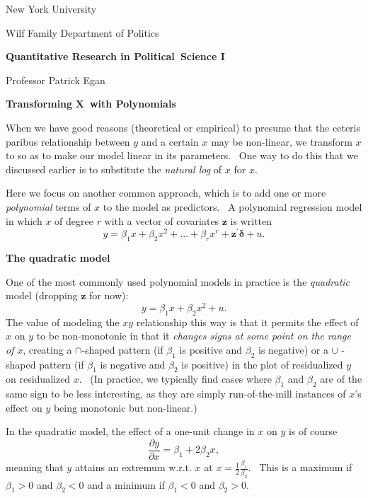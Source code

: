 \documentclass[11pt]{article}
\begin{document}
New York University

Wilf Family Department of Politics

\begin{center}
{\large \textbf{Quantitative Research in Political\ Science I}}

Professor Patrick Egan

\bigskip

\textbf{Transforming }$\mathbf{X}$\textbf{\ with Polynomials}\bigskip 
\end{center}

When we have good reasons (theoretical or empirical) to presume that the
ceteris paribus relationship between $y$ and a certain $x$ may be
non-linear, we transform $x$ to so as to make our model linear in its
parameters. \ One way to do this that we discussed earlier is to substitute
the \textit{natural log }of $x$ for $x$. \ 

Here we focus on another common approach, which is to add one or more 
\textit{polynomial }terms of $x$ to the model as predictors. \ A polynomial
regression model in which $x$ of degree $r$ with a vector of covariates $%
\mathbf{z}$ is written 
\begin{equation*}
y=\beta _{1}x+\beta _{2}x^{2}+...+\beta _{r}x^{r}+\mathbf{z}^{\prime }%
\mathbf{\delta }+u.
\end{equation*}

\medskip \textbf{The quadratic model}

One of the most commonly used polynomial models in practice is the \textit{%
quadratic }model (dropping $\mathbf{z}$ for now):%
\begin{equation*}
y=\beta _{1}x+\beta _{2}x^{2}+u.
\end{equation*}%
The value of modeling the $xy$ relationship this way is that it permits the
effect of $x$ on $y$ to be non-monotonic in that it \textit{changes signs at
some point on the range of }$\mathit{x}$, creating a $\cap $-shaped pattern
(if $\beta _{1}$ is positive and $\beta _{2}$ is negative) or a $\cup $%
-shaped pattern (if $\beta _{1}$ is negative and $\beta _{2}$ is positive)
in the plot of residualized $y$ on residualized $x$. \ (In practice, we
typically find cases where $\beta _{1}$ and $\beta _{2}$ are of the same
sign to be less interesting, as they are simply run-of-the-mill instances of 
$x$'s effect on $y$ being monotonic but non-linear.) \ 

\medskip In the quadratic model, the effect of a one-unit change in $x$ on $y
$ is of course%
\begin{equation*}
\frac{\partial y}{\partial x}=\beta _{1}+2\beta _{2}x,
\end{equation*}%
meaning that $y$ attains an extremum w.r.t. $x$ at $x=\frac{1}{2}\frac{\beta
_{1}}{\beta _{2}}.$ \ This is a maximum if $\beta _{1}>0$ and $\beta _{2}<0$
and a minimum if $\beta _{1}<0$ and $\beta _{2}>0$. \  
\end{document}
